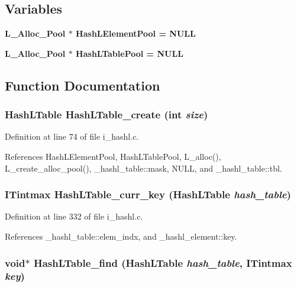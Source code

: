 \subsection*{Variables}
\begin{CompactItemize}
\item 
\bf{L\_\-Alloc\_\-Pool} $\ast$ \bf{Hash\-LElement\-Pool} = NULL
\item 
\bf{L\_\-Alloc\_\-Pool} $\ast$ \bf{Hash\-LTable\-Pool} = NULL
\end{CompactItemize}


\subsection{Function Documentation}
\subsubsection{\setlength{\rightskip}{0pt plus 5cm}\bf{Hash\-LTable} Hash\-LTable\_\-create (int {\em size})}\label{i__hashl_8c_6db31e96a7d097b016178159f9cb6dd8}




Definition at line 74 of file i\_\-hashl.c.

References Hash\-LElement\-Pool, Hash\-LTable\-Pool, L\_\-alloc(), L\_\-create\_\-alloc\_\-pool(), \_\-hashl\_\-table::mask, NULL, and \_\-hashl\_\-table::tbl.
\subsubsection{\setlength{\rightskip}{0pt plus 5cm}\bf{ITintmax} Hash\-LTable\_\-curr\_\-key (\bf{Hash\-LTable} {\em hash\_\-table})}\label{i__hashl_8c_d15fc1f7ab04c4a782bc632cd2968fef}




Definition at line 332 of file i\_\-hashl.c.

References \_\-hashl\_\-table::elem\_\-indx, and \_\-hashl\_\-element::key.
\subsubsection{\setlength{\rightskip}{0pt plus 5cm}void$\ast$ Hash\-LTable\_\-find (\bf{Hash\-LTable} {\em hash\_\-table}, \bf{ITintmax} {\em key})}\label{i__hashl_8c_009e4568177797fedf8b062c5b303c7d}




